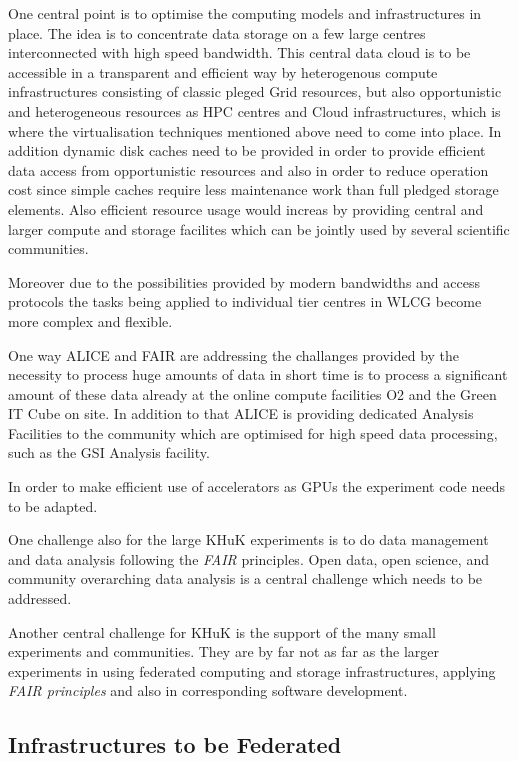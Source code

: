 One central point is to optimise the computing models and infrastructures in place.
The idea is to concentrate data storage on a few large centres interconnected with high speed bandwidth.
This central data cloud is to be accessible in a transparent and efficient way by heterogenous compute infrastructures 
consisting of classic pleged Grid resources, but also opportunistic and heterogeneous resources as HPC centres and Cloud infrastructures,
which is where the virtualisation techniques mentioned above need to come into place.
In addition dynamic disk caches need to be provided in order to provide efficient data access from opportunistic resources and also
in order to reduce operation cost since simple caches require less maintenance work than full pledged storage elements.
Also efficient resource usage would increas by providing central and larger compute and storage facilites which can be jointly used by
several scientific communities.

Moreover due to the possibilities provided by modern bandwidths and access protocols the tasks being applied
to individual tier centres in WLCG become more complex and flexible.

One way ALICE and FAIR are addressing the challanges provided by the necessity to process huge amounts of data
in short time is to process a significant amount of these data already at the online compute facilities O2 and the Green IT Cube on site.
In addition to that ALICE is providing dedicated Analysis Facilities to the community which are optimised for high speed data processing,
such as the GSI Analysis facility.

In order to make efficient use of accelerators as GPUs the experiment code needs to be adapted.

One challenge also for the large KHuK experiments is to do data management and data analysis following the {\em FAIR} principles.
Open data, open science, and community overarching data analysis is a central challenge which needs to be addressed.

Another central challenge for KHuK is the support of the many small experiments and communities.
They are by far not as far as the larger experiments in using federated computing and storage infrastructures,
applying {\em FAIR principles} and also in corresponding software development.

\subsection{Infrastructures to be Federated  }
\label{lab:khukfed}


